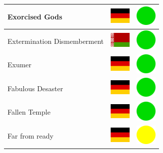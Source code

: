 \documentclass[12pt, a4paper, twoside]{report}
\begin{document}
\begin{center}
\begin{longtable}{|p{5cm}|p{2cm}|p{2cm}|}
 Exorcised Gods                                             & \includegraphics[width=1cm]{../4x3/de} &   \includegraphics[width=1cm]{../likes/y} \\ \hline
 Extermination Dismemberment                                & \includegraphics[width=1cm]{../4x3/by} &   \includegraphics[width=1cm]{../likes/y} \\ \hline
 Exumer                                                     & \includegraphics[width=1cm]{../4x3/de} &   \includegraphics[width=1cm]{../likes/y} \\ \hline
 Fabulous Desaster                                          & \includegraphics[width=1cm]{../4x3/de} &   \includegraphics[width=1cm]{../likes/y} \\ \hline
 Fallen Temple                                              & \includegraphics[width=1cm]{../4x3/de} &   \includegraphics[width=1cm]{../likes/y} \\ \hline
 Far from ready                                             & \includegraphics[width=1cm]{../4x3/de} &   \includegraphics[width=1cm]{../likes/m} \\ \hline

\end{longtable}
\end{center}
\end{document}
